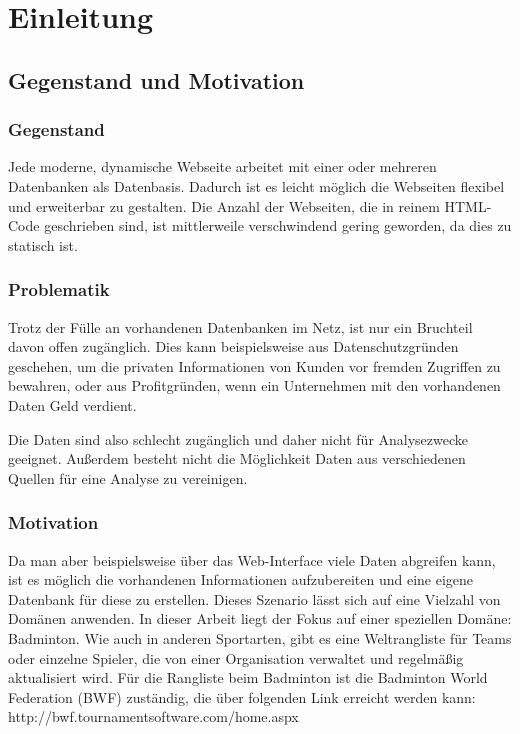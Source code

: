\chapter{Einleitung}
\section{Gegenstand und Motivation}
\subsection{Gegenstand}
Jede moderne, dynamische Webseite arbeitet mit einer oder mehreren Datenbanken als Datenbasis. Dadurch ist es leicht möglich die Webseiten flexibel und erweiterbar zu gestalten. Die Anzahl der Webseiten, die in reinem HTML-Code geschrieben sind, ist mittlerweile verschwindend gering geworden, da dies zu statisch ist. 

\subsection{Problematik}
Trotz der Fülle an vorhandenen Datenbanken im Netz, ist nur ein Bruchteil davon offen zugänglich. Dies kann beispielsweise aus Datenschutzgründen geschehen, um die privaten Informationen von Kunden vor fremden Zugriffen zu bewahren, oder aus Profitgründen, wenn ein Unternehmen mit den vorhandenen Daten Geld verdient. 

Die Daten sind also schlecht zugänglich und daher nicht für Analysezwecke geeignet. Außerdem besteht nicht die Möglichkeit Daten aus verschiedenen Quellen für eine Analyse zu vereinigen. 

\subsection{Motivation}
Da man aber beispielsweise über das Web-Interface viele Daten abgreifen kann, ist es möglich die vorhandenen Informationen aufzubereiten und eine eigene Datenbank für diese zu erstellen. Dieses Szenario lässt sich auf eine Vielzahl von Domänen anwenden. In dieser Arbeit liegt der Fokus auf einer speziellen Domäne: Badminton. Wie auch in anderen Sportarten, gibt es eine Weltrangliste für Teams oder einzelne Spieler, die von einer Organisation verwaltet und regelmäßig aktualisiert wird. Für die Rangliste beim Badminton ist die Badminton World Federation (BWF) zuständig, die über folgenden Link erreicht werden kann: http://bwf.tournamentsoftware.com/home.aspx \cite{BWF2015}


